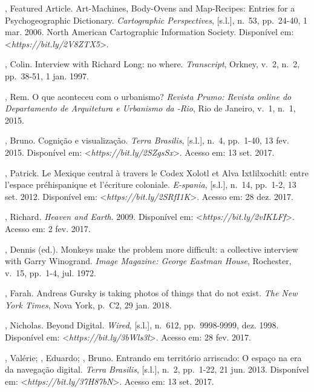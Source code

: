 \begin{Parskip}
, Featured Article. Art-Machines, Body-Ovens and Map-Recipes:
Entries for a Psychogeographic Dictionary. \emph{Cartographic
Perspectives}, {[}s.l.{]}, n.~53, pp.~24-40, 1 mar. 2006. North American
Cartographic Information Society. Disponível em: \textless{}\emph{https://bit.ly/2V8ZTX5}\textgreater{}. %

, Colin. Interview with Richard Long: no where.
\emph{Transcript}, Orkney, v.~2, n.~2, pp.~38-51, 1 jan. 1997.

, Rem. O que aconteceu com o urbanismo? \emph{Revista Prumo:
Revista online do Departamento de Arquitetura e Urbanismo da -Rio},
Rio de Janeiro, v.~1, n.~1, 2015.

, Bruno. Cognição e visualização. \emph{Terra Brasilis},
{[}s.l.{]}, n.~4, pp.~1-40, 13 fev. 2015.
Disponível em: \textless{}\emph{https://bit.ly/2SZgsSx}\textgreater{}. Acesso em: 13 set. 2017.

, Patrick. Le Mexique central à travers le Codex Xolotl et Alva
Ixtlilxochitl: entre l'espace préhispanique et l'écriture coloniale.
\emph{E-spania}, {[}s.l.{]}, n.~14, pp.~1-2, 13 set. 2012. Disponível em:
\textless{}\emph{https://bit.ly/2SRfI1K}\textgreater{}. Acesso em: 28 dez. 2017.

, Richard. \emph{Heaven and Earth}. 2009. Disponível em:
\textless{}\emph{https://bit.ly/2vIKLFf}\textgreater{}. Acesso em: 2 fev. 2017.

, Dennis (ed.). Monkeys make the problem more difficult: a
collective interview with Garry Winogrand. \emph{Image Magazine:
George Eastman House}, Rochester, v.~15, pp.~1-4, jul. 1972.

, Farah. Andreas Gursky is taking photos of things that do not
exist. \emph{The New York Times}, Nova York, p.~C2, 29 jan. 2018.

, Nicholas. Beyond Digital. \emph{Wired}, {[}s.l.{]}, n.~612, pp.~9998-9999, dez. 1998. Disponível em:
\textless{}\emph{https://bit.ly/3bWls3l}\textgreater{}. Acesso em: 28 fev. 2017.

, Valérie; , Eduardo; , Bruno. Entrando em
território arriscado: O espaço na era da navegação digital.
\emph{Terra Brasilis}, {[}s.l.{]}, n.~2, pp.~1-22, 21 jun. 2013. Disponível em: \textless{}\emph{https://bit.ly/37H87bN}\textgreater{}. Acesso em: 13 set. 2017.


\end{Parskip}
